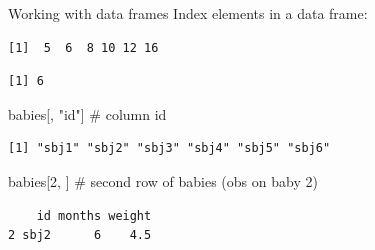 \documentclass[
  ignorenonframetext,
]{beamer}
\newenvironment{Shaded}{\begin{snugshade}}{\end{snugshade}}
\newcommand{\CommentTok}[1]{\textcolor[rgb]{0.54,0.53,0.53}{#1}}
\newcommand{\DecValTok}[1]{\textcolor[rgb]{0.69,0.50,0.00}{#1}}
\newcommand{\NormalTok}[1]{\textcolor[rgb]{0.12,0.11,0.11}{#1}}
\newcommand{\SpecialCharTok}[1]{\textcolor[rgb]{0.24,0.68,0.91}{#1}}
\newcommand{\StringTok}[1]{\textcolor[rgb]{0.75,0.01,0.01}{#1}}
\begin{document}
\begin{frame}[fragile]{Working with data frames}
\protect\hypertarget{working-with-data-frames}{}
Index elements in a data frame:

\begin{Shaded}
\end{Shaded}

\begin{verbatim}
[1]  5  6  8 10 12 16
\end{verbatim}

\begin{Shaded}
\end{Shaded}

\begin{verbatim}
[1] 6
\end{verbatim}

\begin{Shaded}
\begin{Highlighting}[]
\NormalTok{babies[, }\StringTok{"id"}\NormalTok{] }\CommentTok{\# column id}
\end{Highlighting}
\end{Shaded}

\begin{verbatim}
[1] "sbj1" "sbj2" "sbj3" "sbj4" "sbj5" "sbj6"
\end{verbatim}

\begin{Shaded}
\begin{Highlighting}[]
\NormalTok{babies[}\DecValTok{2}\NormalTok{, ] }\CommentTok{\# second row of babies (obs on baby 2)}
\end{Highlighting}
\end{Shaded}

\begin{verbatim}
    id months weight
2 sbj2      6    4.5
\end{verbatim}
\end{frame}
\end{document}
